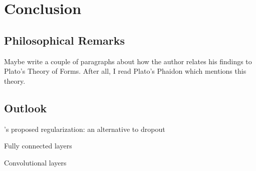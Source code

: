 \section{Conclusion}

\subsection{Philosophical Remarks}
Maybe write a couple of paragraphs about how the author relates his findings to Plato's Theory of Forms.
After all, I read Plato's Phaidon which mentions this theory.

\subsection{Outlook}

\citet{owhadi20}'s proposed regularization: an alternative to dropout

Fully connected layers

Convolutional layers